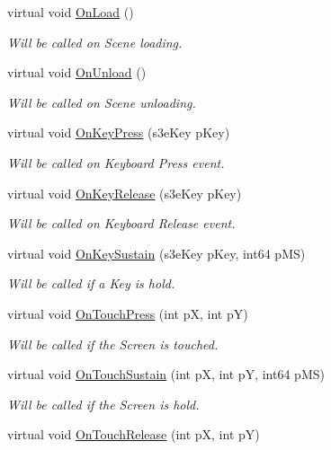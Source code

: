 \begin{DoxyCompactItemize}
virtual void \hyperlink{class_i_ty_actor_a05d286129fce86d004a9a35dd8e4791f}{OnLoad} ()
\begin{DoxyCompactList}\small\item\em Will be called on Scene loading. \end{DoxyCompactList}\item 
virtual void \hyperlink{class_i_ty_actor_a7aaa8b17ac1742d2cc6457e79d9dbe4f}{OnUnload} ()
\begin{DoxyCompactList}\small\item\em Will be called on Scene unloading. \end{DoxyCompactList}\item 
virtual void \hyperlink{class_i_ty_actor_a3a3295eba0fc092e44a9b690d2d242ab}{OnKeyPress} (s3eKey pKey)
\begin{DoxyCompactList}\small\item\em Will be called on Keyboard Press event. \end{DoxyCompactList}\item 
virtual void \hyperlink{class_i_ty_actor_ae0402203392a84e769fad4a989d07b3c}{OnKeyRelease} (s3eKey pKey)
\begin{DoxyCompactList}\small\item\em Will be called on Keyboard Release event. \end{DoxyCompactList}\item 
virtual void \hyperlink{class_i_ty_actor_aa6008d50671f63f7ca482b54179b7725}{OnKeySustain} (s3eKey pKey, int64 pMS)
\begin{DoxyCompactList}\small\item\em Will be called if a Key is hold. \end{DoxyCompactList}\item 
virtual void \hyperlink{class_i_ty_actor_ae828745012aac359147920ccb42801b9}{OnTouchPress} (int pX, int pY)
\begin{DoxyCompactList}\small\item\em Will be called if the Screen is touched. \end{DoxyCompactList}\item 
virtual void \hyperlink{class_i_ty_actor_adb1cde3971b3d75407a8fbb590f7088a}{OnTouchSustain} (int pX, int pY, int64 pMS)
\begin{DoxyCompactList}\small\item\em Will be called if the Screen is hold. \end{DoxyCompactList}\item 
virtual void \hyperlink{class_i_ty_actor_a240c68f34a3b90af8bbef1729a74114a}{OnTouchRelease} (int pX, int pY)

\end{DoxyCompactItemize}
